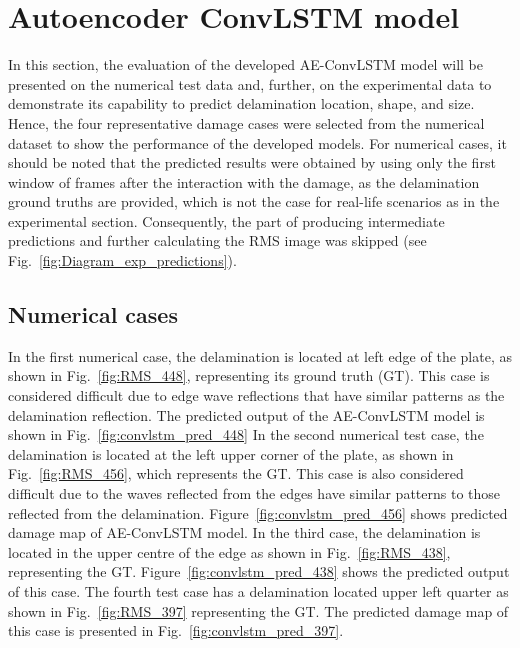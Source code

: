 \section{Autoencoder ConvLSTM model}
\label{sec53}
In this section, the evaluation of the developed AE-ConvLSTM model will be presented on the numerical test data and, further, on the experimental data to demonstrate its capability to predict delamination location, shape, and size.
Hence, the four representative damage cases were selected from the numerical dataset to show the performance of the developed models.
For numerical cases, it should be noted that the predicted results were obtained by using only the first window of frames after the interaction with the damage, as the delamination ground truths are provided, which is not the case for real-life scenarios as in the experimental section. 
Consequently, the part of producing intermediate predictions and further calculating the RMS image was skipped (see Fig.~\ref{fig:Diagram_exp_predictions}).

\subsection{Numerical cases}
\label{sec531}
In the first numerical case, the delamination is located at left edge of the plate, as shown in Fig.~\ref{fig:RMS_448}, representing its ground truth (GT).
This case is considered difficult due to edge wave reflections that have similar patterns as the delamination reflection.
The predicted output of the AE-ConvLSTM model is shown in Fig.~\ref{fig:convlstm_pred_448}
In the second numerical test case, the delamination is located at the left upper corner of the plate, as shown in Fig.~\ref{fig:RMS_456}, which represents the GT.
This case is also considered difficult due to the waves reflected from the edges have similar patterns to those reflected from the delamination.
Figure~\ref{fig:convlstm_pred_456} shows predicted damage map of AE-ConvLSTM model.
In the third case, the delamination is located in the upper centre of the edge as shown in Fig.~\ref{fig:RMS_438}, representing the GT. 
Figure~\ref{fig:convlstm_pred_438} shows the predicted output of this case.
The fourth test case has a delamination located upper left quarter as shown in Fig.~\ref{fig:RMS_397} representing the GT.
The predicted damage map of this case is presented in Fig.~\ref{fig:convlstm_pred_397}.

